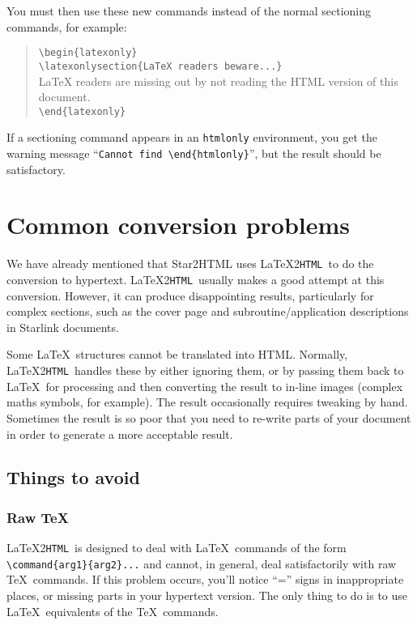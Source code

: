 \documentclass[twoside,11pt,nolof]{starlink}
\providecommand{\latextohtml}{\LaTeX2\texttt{HTML}}
\begin{document}
You must then use these new commands instead of the normal sectioning
commands, for example:

\begin{quote}
\verb!\begin!\verb!{latexonly}!\\
\verb!\latexonlysection{LaTeX readers beware...}!\\
LaTeX readers are missing out by not reading the HTML version of
this document.\\
\verb!\end!\verb!{latexonly}!
\end{quote}

If a sectioning command appears in an \texttt{htmlonly} environment, you get
the warning message ``\verb#Cannot find \end#\verb#{htmlonly}#'', but
the result should be satisfactory.

\section{\label{common_problems}Common conversion problems}

We have already mentioned that Star2HTML uses \latextohtml\ to do the
conversion to hypertext.
\latextohtml\ usually makes a good attempt at this conversion.
However, it can produce disappointing results, particularly for complex
sections, such as the cover page and subroutine/application descriptions in
Starlink documents.

Some \LaTeX\ structures cannot be translated into HTML.
Normally, \latextohtml\ handles these by either ignoring them, or by passing
them back to \LaTeX\ for processing and then converting the result to
in-line images (complex maths symbols, for example).
The result occasionally requires tweaking by hand.
Sometimes the result is so poor that you need to re-write parts of your
document in order to generate a more acceptable result.

\subsection{Things to avoid}

\subsubsection{Raw \TeX}

\latextohtml\ is designed to deal with \LaTeX\ commands of the form
\verb#\command{arg1}{arg2}...# and cannot, in general, deal satisfactorily
with raw \TeX\ commands.
If this problem occurs, you'll notice ``='' signs in inappropriate places, or
missing parts in your hypertext version.
The only thing to do is to use \LaTeX\ equivalents of the \TeX\ commands.
\end{document}
